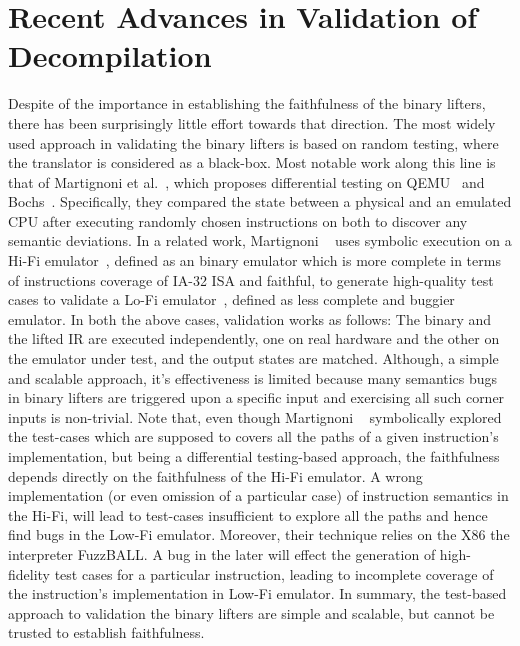 \section{Recent Advances in Validation of Decompilation}\label{sec:recent-advances}

Despite of the importance in establishing the faithfulness of the binary
lifters, there has been surprisingly little effort towards that direction.
%
The most widely used approach in validating the binary lifters is based on
random testing, where the translator is considered as a black-box. Most notable
work along this line  is that of Martignoni et al.~\cite{Martignoni:ISSTA2009,
  Martignoni:ISSTA2010}, which proposes differential testing on
  QEMU~\cite{QEMU:USENIX05} and Bochs~\cite{Bochs1996}.  Specifically, they
  compared the state between a physical and an emulated CPU after executing
  randomly chosen instructions on both to discover any semantic deviations. In
  a related work, Martignoni \etal~\cite{Martignoni:ASPLOS2012} uses symbolic
  execution on a Hi-Fi emulator~\cite{Bochs1996}, defined as an binary emulator
  which is more complete in terms of instructions coverage of IA-32 ISA and
  faithful, to generate high-quality test cases to validate  a Lo-Fi
  emulator~\cite{QEMU:USENIX05}, defined as  less complete and buggier
  emulator. In both the above cases, validation works as follows: The binary
  and the lifted IR are executed independently, one on real hardware and the
  other on the emulator under test, and the output states are matched.
  Although, a simple and scalable approach, it's effectiveness is limited
  because many semantics bugs in binary lifters are triggered upon a specific
  input and exercising all such corner inputs is non-trivial. Note that, even
  though Martignoni \etal~\cite{Martignoni:ASPLOS2012} symbolically explored
  the test-cases which are supposed to covers all the paths of a given
  instruction's implementation, but being a differential testing-based
  approach, the faithfulness depends directly on  the faithfulness of the Hi-Fi
  emulator. A wrong implementation (or even omission of a particular case) of
  instruction semantics in the Hi-Fi, will lead to test-cases insufficient to
  explore all the paths and hence find bugs in the Low-Fi emulator. Moreover,
  their technique relies on the X86 the interpreter FuzzBALL. A bug in the
  later will effect the generation of high-fidelity test cases for a particular
  instruction, leading to incomplete coverage of the instruction's
  implementation in Low-Fi emulator. In summary, the test-based approach to
  validation the binary lifters are simple and scalable, but cannot be trusted
  to establish faithfulness.

